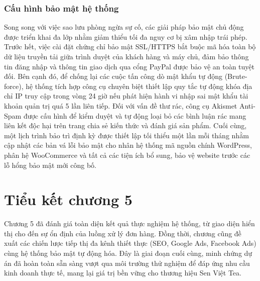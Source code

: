 \subsubsection{Cấu hình bảo mật hệ thống}

Song song với việc sao lưu phòng ngừa sự cố, các giải pháp bảo mật chủ động được triển khai đa lớp nhằm giảm thiểu tối đa nguy cơ bị xâm nhập trái phép. Trước hết, việc cài đặt chứng chỉ bảo mật SSL/HTTPS bắt buộc mã hóa toàn bộ dữ liệu truyền tải giữa trình duyệt của khách hàng và máy chủ, đảm bảo thông tin đăng nhập và thông tin giao dịch qua cổng PayPal được bảo vệ an toàn tuyệt đối. Bên cạnh đó, để chống lại các cuộc tấn công dò mật khẩu tự động (Brute-force), hệ thống tích hợp công cụ chuyên biệt thiết lập quy tắc tự động khóa địa chỉ IP truy cập trong vòng 24 giờ nếu phát hiện hành vi nhập sai mật khẩu tài khoản quản trị quá 5 lần liên tiếp. Đối với vấn đề thư rác, công cụ Akismet Anti-Spam được cấu hình để kiểm duyệt và tự động loại bỏ các bình luận rác mang liên kết độc hại trên trang chia sẻ kiến thức và đánh giá sản phẩm. Cuối cùng, một lịch trình bảo trì định kỳ được thiết lập tối thiểu một lần mỗi tháng nhằm cập nhật các bản vá lỗi bảo mật cho nhân hệ thống mã nguồn chính WordPress, phân hệ WooCommerce và tất cả các tiện ích bổ sung, bảo vệ website trước các lỗ hổng bảo mật mới công bố.

\section*{Tiểu kết chương 5}
Chương 5 đã đánh giá toàn diện kết quả thực nghiệm hệ thống, từ giao diện hiển thị cho đến sự ổn định của luồng xử lý đơn hàng. Đồng thời, chương cũng đề xuất các chiến lược tiếp thị đa kênh thiết thực (SEO, Google Ads, Facebook Ads) cùng hệ thống bảo mật tự động hóa. Đây là giai đoạn cuối cùng, minh chứng dự án đã hoàn toàn sẵn sàng vượt qua môi trường thử nghiệm để đáp ứng nhu cầu kinh doanh thực tế, mang lại giá trị bền vững cho thương hiệu Sen Việt Tea.